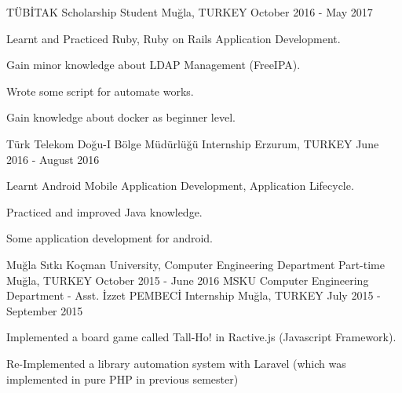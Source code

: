 \begin{cventries}
	\cventry
		{TÜBİTAK}
		{Scholarship Student}
		{Muğla, TURKEY}
		{October 2016 - May 2017}
		{
			\begin{cvitems}
				\item {Learnt and Practiced Ruby, Ruby on Rails Application Development.}
				\item {Gain minor knowledge about LDAP Management (FreeIPA).}
				\item {Wrote some script for automate works.}
				\item {Gain knowledge about docker as beginner level.}
			\end{cvitems}
		}
	\cventry
		{Türk Telekom Doğu-I Bölge Müdürlüğü}
		{Internship}
		{Erzurum, TURKEY}
		{June 2016 - August 2016}
		{
			\begin{cvitems}
				\item {Learnt Android Mobile Application Development, Application Lifecycle.}
				\item {Practiced and improved Java knowledge.}
				\item {Some application development for android.}
			\end{cvitems}
		}
	\cventry
		{Muğla Sıtkı Koçman University, Computer Engineering Department}
		{Part-time}
		{Muğla, TURKEY}
		{October 2015 - June 2016}
		{}
	\cventry
		{MSKU Computer Engineering Department - Asst. İzzet PEMBECİ}
		{Internship}
		{Muğla, TURKEY}
		{July 2015 - September 2015}
		{
		  \begin{cvitems}
			\item {Implemented a board game called Tall-Ho! in Ractive.js (Javascript Framework).}
			\item {Re-Implemented a library automation system with Laravel (which was implemented in pure PHP in previous semester)}
		  \end{cvitems}
		}

\end{cventries}
